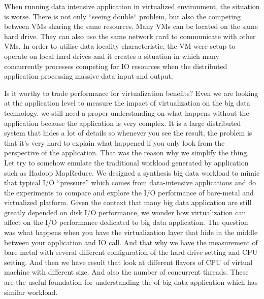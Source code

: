 \documentclass{acmsig}
\begin{document}
When running data intensive application in virtualized environment, the situation is worse. There is not only ``seeing double`` problem, but also the competing between VMs sharing the same resources. Many VMs can be located on the same hard drive. They can also use the same network card to communicate with other VMs. In order to utilise data locality characteristic, the VM were setup to operate on local hard drives and it creates a situation in which many concurrently processes competing for IO resources when the distributed application processing massive data input and output.

Is it worthy to trade performance for virtualization benefits? Even we are looking at the application level to measure the impact of virtualization on the big data technology. we still need a proper understanding on what happens without the application because the application is very complex. It is a large distributed system that hides a lot of details so whenever you see the result, the problem is that it's very hard to explain what happened if you only look from the perspective of the application. That was the reason why we simplify the thing. Let try to somehow emulate the traditional workload generated by application such as Hadoop MapReduce. We designed a synthesis big data workload to mimic that typical I/O ``pressure'' which comes from data-intensive applications and do the experiments to compare and explore the I/O performance of bare-metal and virtualized platform. Given the context that many big data application are still greatly depended on disk I/O performance, we wonder how virtualization can affect on the I/O performance dedicated to big data application. The question was what happens when you have the virtualization layer that hide in the middle between your application and IO call. And that why we have the measurement of bare-metal with several different configuration of the hard drive setting and CPU setting. And then we have result that look at different flavors of CPU of virtual machine with different size. And also the number of concurrent threads. These are the useful foundation for understanding the of big data application which has similar workload.
\end{document}
